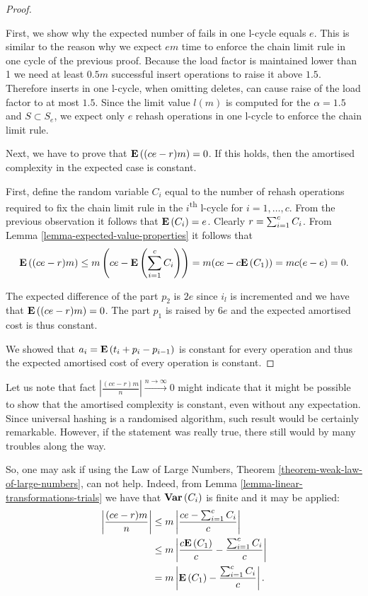\begin{proof}
\begin{itemize}
First, we show why the expected number of fails in one l-cycle equals $e$. This is similar to the reason why we expect $em$ time to enforce the chain limit rule in one cycle of the previous proof. Because the load factor is maintained lower than 1 we need at least $0.5 m$ successful insert operations to raise it above $1.5$. Therefore inserts in one l-cycle, when omitting deletes, can cause raise of the load factor to at most $1.5$. Since the limit value $l(m)$ is computed for the $\alpha = 1.5$ and $S \subset S_e$, we expect only $e$ rehash operations in one l-cycle to enforce the chain limit rule.

Next, we have to prove that $\mathbf{E}\left((ce - r)m\right) = 0$. If this holds, then the amortised complexity in the expected case is constant.

First, define the random variable $C_i$ equal to the number of rehash operations required to fix the chain limit rule in the $i$\textsuperscript{th} l-cycle for $i = 1, \dots, c$. From the previous observation it follows that $\mathbf{E}\left(C_i\right) = e$. Clearly $r = \sum\displaylimits_{i = 1}^{c} C_i$. From Lemma \ref{lemma-expected-value-properties} it follows that
\[
	\mathbf{E}\left({(ce - r)m}\right) \leq {m}\left(ce - \mathbf{E}\left(\displaystyle\sum_{i = 1}^{c} C_i\right)\right) = m(ce - c\mathbf{E}\left(C_1\right)) = mc(e - e) = 0 \text{.}
\]

The expected difference of the part $p_2$ is $2e$ since $i_l$ is incremented and we have that $\mathbf{E}\left((ce -r)m\right) = 0$. The part $p_1$ is raised by $6e$ and the expected amortised cost is thus constant.
\end{itemize}

We showed that $a_i = \mathbf{E}\left(t_i + p_i - p_{i - 1}\right)$ is constant for every operation and thus the  expected amortised cost of every operation is constant. 
\end{proof}

Let us note that fact $\left|\frac{(ce - r)m}{n}\right| \xrightarrow{n \rightarrow \infty} 0$ might indicate that it might be possible to show that the amortised complexity is constant, even without any expectation. Since universal hashing is a randomised algorithm, such result would be certainly remarkable. However, if the statement was really true, there still would by many troubles along the way.

So, one may ask if using the Law of Large Numbers, Theorem \ref{theorem-weak-law-of-large-numbers}, can not help. Indeed, from Lemma \ref{lemma-linear-transformations-trials} we have that $\mathbf{Var}\left(C_i\right)$ is finite and it may be applied:
\[
\begin{split}
\left|\frac{(ce - r)m}{n}\right|
	& \leq m \left|\frac{ce - \sum\displaylimits_{i = 1}^{c} C_i}{c}\right| \\
	& \leq m \left|\frac{c\mathbf{E}\left(C_1\right)}{c} - \frac{\sum\displaylimits_{i = 1}^{c} C_i}{c}\right| \\
	& = m \left|\mathbf{E}\left(C_1\right) - \frac{\sum\displaylimits_{i = 1}^{c} C_i}{c}\right| \text{.}
\end{split}
\]

